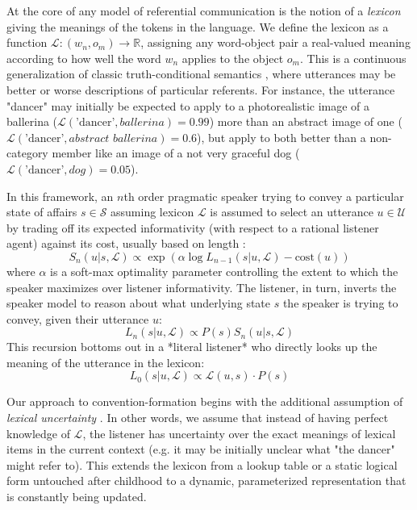 At the core of any model of referential communication is the notion of a \emph{lexicon} giving the meanings of the tokens in the language. 
We define the lexicon as a function $\mathcal{L}: (w_n, o_m) \rightarrow \mathbb{R}$, assigning any word-object pair a real-valued meaning according to how well the word $w_n$ applies to the object $o_m$. 
This is a continuous generalization of classic truth-conditional semantics , where utterances may be better or worse descriptions of particular referents. 
For instance, the utterance "dancer" may initially be expected to apply to a photorealistic image of a ballerina ($\mathcal{L}(\textrm{'dancer'}, \textit{ballerina}) = 0.99$) more than an abstract image of one ($\mathcal{L}(\textrm{'dancer'}, \textit{abstract ballerina}) =0.6$), but apply to both better than a non-category member like an image of a not very graceful dog ($\mathcal{L}(\textrm{'dancer'}, \textit{dog}) = 0.05$).

In this framework, an $n$th order pragmatic speaker trying to convey a particular state of affairs $s \in \mathcal{S}$ assuming lexicon $\mathcal{L}$ is assumed to select an utterance $u \in \mathcal{U}$ by trading off its expected informativity (with respect to a rational listener agent) against its cost, usually based on length \cite{GoodmanFrank16_RSATiCS}:
$$S_n(u | s, \mathcal{L}) \propto \exp{\left(\alpha \log L_{n-1}(s | u, \mathcal{L}) - \textrm{cost}(u)\right)}$$
where $\alpha$ is a soft-max optimality parameter controlling the extent to which the speaker maximizes over listener informativity. The listener, in turn, inverts the speaker model to reason about what underlying state $s$ the speaker is trying to convey, given their utterance $u$:
$$L_n(s | u, \mathcal{L}) \propto P(s) S_{n}(u | s, \mathcal{L})$$
\indent This recursion bottoms out in a *literal listener* who directly looks up the meaning of the utterance in the lexicon:
$$L_0(s | u, \mathcal{L}) \propto \mathcal{L}(u, s)\cdot P(s)$$

Our approach to convention-formation begins with the additional assumption of \emph{lexical uncertainty} \cite{SmithGoodmanFrank13_RecursivePragmaticReasoningNIPS,BergenLevyGoodman16_LexicalUncertainty}. 
In other words, we assume that instead of having perfect knowledge of $\mathcal{L}$, the listener has uncertainty over the exact meanings of lexical items in the current context (e.g. it may be initially unclear what "the dancer" might refer to). 
This extends the lexicon from a lookup table or a static logical form untouched after childhood to a dynamic, parameterized representation that is constantly being updated.

